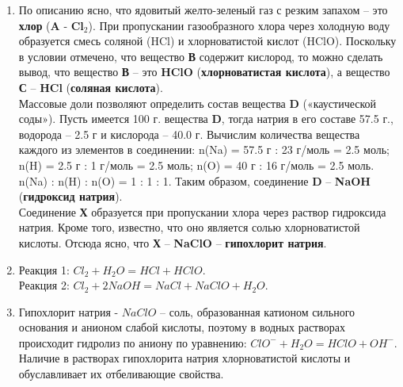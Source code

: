 \solutionSection
\begin{enumerate}
\item По описанию ясно, что ядовитый желто-зеленый газ с резким запахом – это \textbf{хлор} (\textbf{A} - \textbf{Cl$_2$}). При пропускании газообразного хлора через холодную воду образуется смесь соляной (HCl) и хлорноватистой кислот (HClO). Поскольку в условии отмечено, что вещество \textbf{В} содержит кислород, то можно сделать вывод, что вещество \textbf{В} – это \textbf{HClO} (\textbf{хлорноватистая кислота}), а вещество \textbf{С} – \textbf{HCl} (\textbf{соляная кислота}).\\
Массовые доли позволяют определить состав вещества \textbf{D} («каустической соды»). Пусть имеется 100 г. вещества \textbf{D}, тогда натрия в его составе 57.5 г., водорода – 2.5 г и кислорода – 40.0 г. Вычислим количества вещества каждого из элементов в соединении: n(Na) = 57.5 г : 23 г/моль = 2.5 моль; n(H) = 2.5 г : 1 г/моль = 2.5 моль; n(O) = 40 г : 16 г/моль = 2.5 моль. n(Na) : n(H) : n(O) = 1 : 1 : 1. Таким образом, соединение \textbf{D} – \textbf{NaOH} (\textbf{гидроксид натрия}).\\
Соединение \textbf{Х} образуется при пропускании хлора через раствор гидроксида натрия. Кроме того, известно, что оно является солью хлорноватистой кислоты. Отсюда ясно, что \textbf{Х} – \textbf{NaClO} – \textbf{гипохлорит натрия}.
\item Реакция 1: $Cl_2 + H_2O = HCl + HClO$.\\
Реакция 2: $Cl_2 + 2NaOH = NaCl + NaClO + H_2O$.
\item Гипохлорит натрия - $NaClO$ – соль, образованная катионом сильного основания и анионом слабой кислоты, поэтому в водных растворах происходит гидролиз по аниону по уравнению: $ClO^- + H_2O = HClO + OH^-$. Наличие в растворах гипохлорита натрия хлорноватистой кислоты и обуславливает их отбеливающие свойства.


\end{enumerate}
